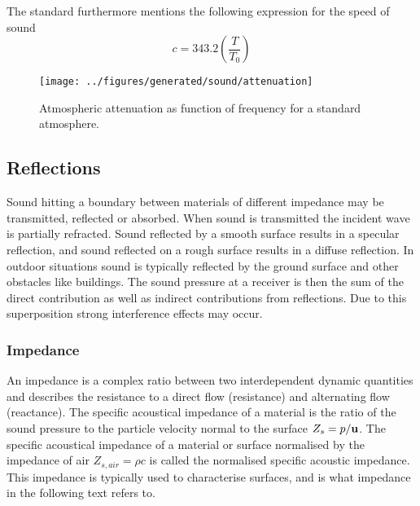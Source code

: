 The standard furthermore mentions the following expression for the speed of sound
\begin{equation}
c = 343.2 \left( \frac{T}{T_0} \right)
\end{equation}

\begin{figure}[H]
        \centering
        \texttt{[image: ../figures/generated/sound/attenuation]}
        \caption{Atmospheric attenuation as function of frequency for a standard atmosphere.}
        \label{fig:theory:sound:attenuation}
\end{figure}

\newpage
\subsection{Reflections}
Sound hitting a boundary between materials of different impedance may be
transmitted, reflected or absorbed. When sound is transmitted the incident wave
is partially refracted. Sound reflected by a smooth surface results in a
specular reflection, and sound reflected on a rough surface results in a diffuse
reflection. In outdoor situations sound is typically reflected by the ground surface and other
obstacles like buildings. The sound pressure at a receiver is then the sum of
the direct contribution as well as indirect contributions from reflections.
Due to this superposition strong interference effects may occur.

\subsubsection*{Impedance}
An impedance is a complex ratio between two interdependent dynamic quantities
and describes the resistance to a direct flow (resistance) and alternating flow
(reactance). The specific acoustical impedance of a material is the ratio of the
sound pressure to the particle velocity normal to the surface $Z_{s} =
p/\mathbf{u}$. The specific acoustical impedance of a material or surface
normalised by the impedance of air $Z_{s, air} = \rho c$ is called the
normalised specific acoustic impedance. This impedance is typically used to
characterise surfaces, and is what impedance in the following text refers to.

